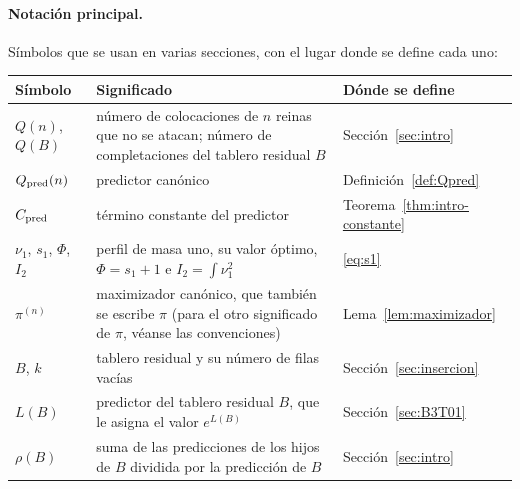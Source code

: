 \paragraph{Notación principal.}
Símbolos que se usan en varias secciones, con el lugar donde se define cada uno:
\begin{center}
\small
\begin{tabular}{@{}l>{\raggedright\arraybackslash}p{}l@{}}
\toprule
Símbolo & Significado & Dónde se define\\
\midrule
$Q(n)$, $Q(B)$ & número de colocaciones de $n$ reinas que no se atacan; número de completaciones del
tablero residual $B$ & Sección~\ref{sec:intro}\\
$Q_{\rm pred}(n)$ & predictor canónico & Definición~\ref{def:Qpred}\\
$C_{\rm pred}$ & término constante del predictor & Teorema~\ref{thm:intro-constante}\\
$\nu_1$, $s_1$, $\Phi$, $I_2$ & perfil de masa uno, su valor óptimo, $\Phi=s_1+1$ e
$I_2=\int\nu_1^2$ & \eqref{eq:s1}\\
$\pi^{(n)}$ & maximizador canónico, que también se escribe $\pi$ (para el otro significado de $\pi$,
véanse las convenciones) & Lema~\ref{lem:maximizador}\\
$B$, $k$ & tablero residual y su número de filas vacías & Sección~\ref{sec:insercion}\\
$L(B)$ & predictor del tablero residual $B$, que le asigna el valor $e^{L(B)}$ &
Sección~\ref{sec:B3T01}\\
$\rho(B)$ & suma de las predicciones de los hijos de $B$ dividida por la predicción de $B$ &
Sección~\ref{sec:intro}\\
\bottomrule
\end{tabular}
\end{center}
